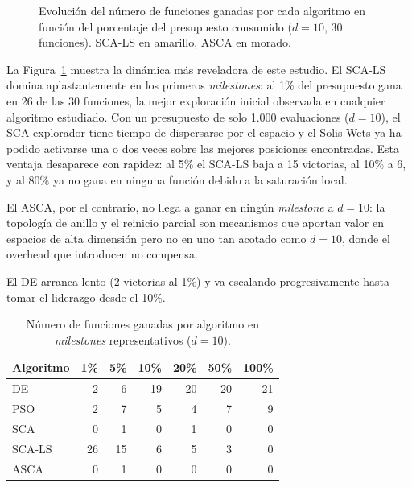 \documentclass[12pt,a4paper]{article}
\begin{document}
\begin{figure}[H]
\caption{Evolución del número de funciones ganadas por cada algoritmo en función del porcentaje del presupuesto consumido ($d=10$, 30 funciones). SCA-LS en amarillo, ASCA en morado.}
\label{fig:convergencia_wins_sca_ls_d10}
\end{figure}
 
La Figura~\ref{fig:convergencia_wins_sca_ls_d10} muestra la dinámica más reveladora de este estudio. El SCA-LS domina aplastantemente en los primeros \textit{milestones}: al {1\% del presupuesto} gana en {26 de las 30 funciones}, la mejor exploración inicial observada en cualquier algoritmo estudiado. Con un presupuesto de solo 1.000 evaluaciones ($d=10$), el SCA explorador tiene tiempo de dispersarse por el espacio y el Solis-Wets ya ha podido activarse una o dos veces sobre las mejores posiciones encontradas. Esta ventaja desaparece con rapidez: al 5\% el SCA-LS baja a 15 victorias, al 10\% a 6, y al 80\% ya no gana en ninguna función debido a la saturación local.
 
El ASCA, por el contrario, no llega a ganar en ningún \textit{milestone} a $d=10$: la topología de anillo y el reinicio parcial son mecanismos que aportan valor en espacios de alta dimensión pero no en uno tan acotado como $d=10$, donde el overhead que introducen no compensa.
 
El DE arranca lento (2 victorias al 1\%) y va escalando progresivamente hasta tomar el liderazgo desde el 10\%.
 
\begin{table}[H]
\centering
\caption{Número de funciones ganadas por algoritmo en \textit{milestones} representativos ($d=10$).}
\label{tab:resumen_victorias_sca_ls_d10}
\renewcommand{\arraystretch}{1.2}
\begin{tabular}{lrrrrrr}
\toprule
\textbf{Algoritmo} & \textbf{1\%} & \textbf{5\%} & \textbf{10\%} & \textbf{20\%} & \textbf{50\%} & \textbf{100\%} \\
\midrule
DE      &  2 &  6 & 19 & 20 & 20 & 21 \\
PSO     &  2 &  7 &  5 &  4 &  7 &  9 \\
SCA     &  0 &  1 &  0 &  1 &  0 &  0 \\
SCA-LS  & 26 & 15 &  6 &  5 &  3 &  0 \\
ASCA    &  0 &  1 &  0 &  0 &  0 &  0 \\
\bottomrule
\end{tabular}
\end{table}
 
\end{document}
